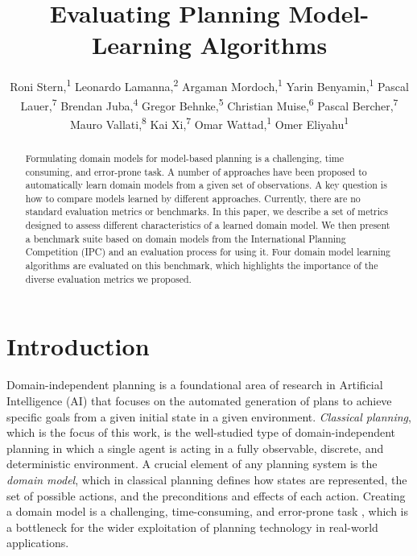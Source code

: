 \documentclass[letterpaper]{article} %
\title{Evaluating Planning Model-Learning Algorithms}
\author{
    Roni Stern,\textsuperscript{\rm 1}
    Leonardo Lamanna,\textsuperscript{\rm 2}
    Argaman Mordoch,\textsuperscript{\rm 1}
    Yarin Benyamin,\textsuperscript{\rm 1}
    Pascal Lauer,\textsuperscript{\rm 7}
    Brendan Juba,\textsuperscript{\rm 4}
    Gregor Behnke,\textsuperscript{\rm 5}
    Christian Muise,\textsuperscript{\rm 6}
    Pascal Bercher,\textsuperscript{\rm 7}
    Mauro Vallati,\textsuperscript{\rm 8}
    Kai Xi,\textsuperscript{\rm 7}
    Omar Wattad,\textsuperscript{\rm 1}
    Omer Eliyahu\textsuperscript{\rm 1}
}
\newif\ifaddcomments
\newcommand{\roni}[1]{\ifaddcomments{\textcolor{red}{[Roni: #1]}}\fi}
\newcommand{\pascalJr}[1]{\ifaddcomments{\textcolor{cyan}{[Pascal L.: {#1}]}}\fi}
\begin{document}
\maketitle

\begin{abstract}
Formulating domain models for model-based planning is a challenging, time consuming, and error-prone task. A number of approaches have been proposed to automatically learn domain models from a given set of observations. A key question is how to compare models learned by different approaches. 
Currently, there are no standard evaluation metrics or benchmarks. 
In this paper, we describe a set of metrics designed to assess different characteristics of a learned domain model. We then present a benchmark suite based on domain models from the International Planning Competition (IPC) and an evaluation process for using it.
Four domain model learning algorithms are evaluated on this benchmark, which highlights the importance of the diverse evaluation metrics we proposed.
\end{abstract}

%



\section{Introduction}



Domain-independent planning is a foundational area of research in Artificial Intelligence (AI) that focuses on the automated generation of plans to achieve specific goals from a given initial state in a given environment. 
\emph{Classical planning}, which is the focus of this work, is the well-studied type of domain-independent planning in which a single agent is acting in a fully observable, discrete, and deterministic environment. 
A crucial element of any planning system is the \emph{domain model}, which in classical planning defines how states are represented, the set of possible actions, and the preconditions and effects of each action. 
Creating a domain model is a challenging, time-consuming, and error-prone task \citep{DBLP:conf/kcap/McCluskeyVV17}, which is a bottleneck for the wider exploitation of planning technology in real-world applications. 
\end{document}
